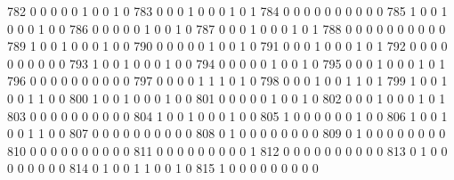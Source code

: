 \documentclass[compress,8pt]{beamer}
\begin{document}
\begin{frame}
\begin{Schunk}
  782      0       0   0              0        0    1       0       0   1   0
  783      0       0   0              1        0    0       0       1   0   1
  784      0       0   0              0        0    0       0       0   0   0
  785      1       0   0              1        0    0       0       1   0   0
  786      0       0   0              0        0    1       0       0   1   0
  787      0       0   0              1        0    0       0       1   0   1
  788      0       0   0              0        0    0       0       0   0   0
  789      1       0   0              1        0    0       0       1   0   0
  790      0       0   0              0        0    1       0       0   1   0
  791      0       0   0              1        0    0       0       1   0   1
  792      0       0   0              0        0    0       0       0   0   0
  793      1       0   0              1        0    0       0       1   0   0
  794      0       0   0              0        0    1       0       0   1   0
  795      0       0   0              1        0    0       0       1   0   1
  796      0       0   0              0        0    0       0       0   0   0
  797      0       0   0              0        1    1       1       0   1   0
  798      0       0   0              1        0    0       1       1   0   1
  799      1       0   0              1        0    0       1       1   0   0
  800      1       0   0              1        0    0       0       1   0   0
  801      0       0   0              0        0    1       0       0   1   0
  802      0       0   0              1        0    0       0       1   0   1
  803      0       0   0              0        0    0       0       0   0   0
  804      1       0   0              1        0    0       0       1   0   0
  805      1       0   0              0        0    0       0       1   0   0
  806      1       0   0              1        0    0       1       1   0   0
  807      0       0   0              0        0    0       0       0   0   0
  808      0       1   0              0        0    0       0       0   0   0
  809      0       1   0              0        0    0       0       0   0   0
  810      0       0   0              0        0    0       0       0   0   0
  811      0       0   0              0        0    0       0       0   0   1
  812      0       0   0              0        0    0       0       0   0   0
  813      0       1   0              0        0    0       0       0   0   0
  814      0       1   0              0        1    1       0       0   1   0
  815      1       0   0              0        0    0       0       0   0   0

\end{Schunk}
\end{frame}
\end{document}
